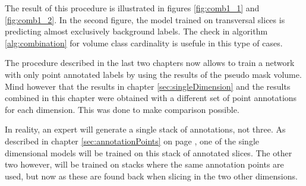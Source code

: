\par{
    The result of this procedure is illustrated in figures \ref{fig:comb1_1} and \ref{fig:comb1_2}.
    In the second figure, the model trained on transversal slices is predicting almost exclusively background labels.
    The check in algorithm \ref{alg:combination} for volume class cardinality is usefule in this type of cases.
}   
\par{
    The procedure described in the last two chapters now allows to train a network with only point annotated labels by using the results of the pseudo mask volume.
    Mind however that the results in chapter \ref{sec:singleDimension} and the results combined in this chapter were obtained with a different set of point annotations for each dimension.
    This was done to make comparison possible.
}
\par{
    In reality, an expert will generate a single stack of annotations, not three.
    As described in chapter \ref{sec:annotationPoints} on page \pageref{sec:annotationPoints}, one of the single dimensional models will be trained on this stack of annotated slices.
    The other two however, will be trained on stacks where the same annotation points are used, but now as these are found back when slicing in the two other dimensions.
}

